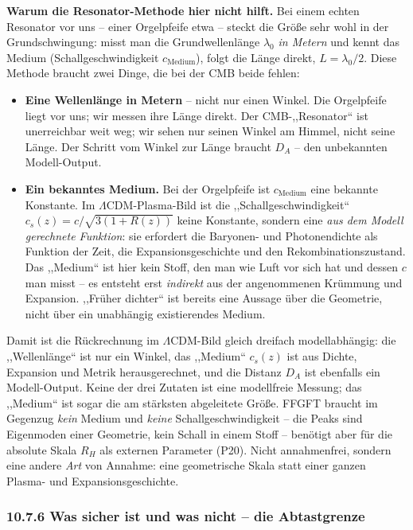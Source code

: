 \textbf{Warum die Resonator-Methode hier nicht hilft.} Bei einem echten
Resonator vor uns -- einer Orgelpfeife etwa -- steckt die Größe sehr wohl
in der Grundschwingung: misst man die Grundwellenlänge $\lambda_0$
\emph{in Metern} und kennt das Medium (Schallgeschwindigkeit
$c_\mathrm{Medium}$), folgt die Länge direkt, $L = \lambda_0/2$. Diese
Methode braucht zwei Dinge, die bei der CMB beide fehlen:

\begin{itemize}
  \item \textbf{Eine Wellenlänge in Metern} -- nicht nur einen Winkel.
        Die Orgelpfeife liegt vor uns; wir messen ihre Länge direkt.
        Der CMB-,,Resonator`` ist unerreichbar weit weg; wir sehen nur
        seinen Winkel am Himmel, nicht seine Länge. Der Schritt vom
        Winkel zur Länge braucht $D_A$ -- den unbekannten Modell-Output.
  \item \textbf{Ein bekanntes Medium.} Bei der Orgelpfeife ist
        $c_\mathrm{Medium}$ eine bekannte Konstante. Im
        $\Lambda$CDM-Plasma-Bild ist die ,,Schallgeschwindigkeit``
        $c_s(z) = c/\sqrt{3(1+R(z))}$ keine Konstante, sondern eine
        \emph{aus dem Modell gerechnete Funktion}: sie erfordert die
        Baryonen- und Photonendichte als Funktion der Zeit, die
        Expansionsgeschichte und den Rekombinationszustand. Das
        ,,Medium`` ist hier kein Stoff, den man wie Luft vor sich hat
        und dessen $c$ man misst -- es entsteht erst \emph{indirekt} aus
        der angenommenen Krümmung und Expansion. ,,Früher dichter`` ist
        bereits eine Aussage über die Geometrie, nicht über ein
        unabhängig existierendes Medium.
\end{itemize}

Damit ist die Rückrechnung im $\Lambda$CDM-Bild gleich dreifach
modellabhängig: die ,,Wellenlänge`` ist nur ein Winkel, das ,,Medium``
$c_s(z)$ ist aus Dichte, Expansion und Metrik herausgerechnet, und die
Distanz $D_A$ ist ebenfalls ein Modell-Output. Keine der drei Zutaten ist
eine modellfreie Messung; das ,,Medium`` ist sogar die am stärksten
abgeleitete Größe. FFGFT braucht im Gegenzug \emph{kein} Medium und
\emph{keine} Schallgeschwindigkeit -- die Peaks sind Eigenmoden einer
Geometrie, kein Schall in einem Stoff -- benötigt aber für die absolute
Skala $R_H$ als externen Parameter (P20). Nicht annahmenfrei, sondern
eine andere \emph{Art} von Annahme: eine geometrische Skala statt einer
ganzen Plasma- und Expansionsgeschichte.

\subsubsection*{10.7.6 Was sicher ist und was nicht -- die Abtastgrenze}

